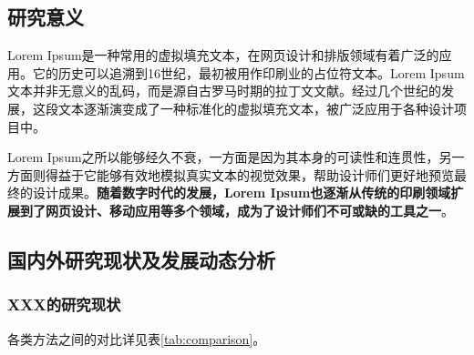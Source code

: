 \documentclass[UTF8,12pt,AutoFakeBold=2]{ctexart}
\begin{document}



\subsection{研究意义}

Lorem Ipsum是一种常用的虚拟填充文本，在网页设计和排版领域有着广泛的应用。它的历史可以追溯到16世纪，最初被用作印刷业的占位符文本。Lorem Ipsum文本并非无意义的乱码，而是源自古罗马时期的拉丁文文献。经过几个世纪的发展，这段文本逐渐演变成了一种标准化的虚拟填充文本，被广泛应用于各种设计项目中\cite{iijima1991helical}。

Lorem Ipsum之所以能够经久不衰，一方面是因为其本身的可读性和连贯性，另一方面则得益于它能够有效地模拟真实文本的视觉效果，帮助设计师们更好地预览最终的设计成果。\textbf{随着数字时代的发展，Lorem Ipsum也逐渐从传统的印刷领域扩展到了网页设计、移动应用等多个领域，成为了设计师们不可或缺的工具之一}\cite{iijima1991helical, aharony2000large, susskind1995world, kitaev2003fault}。

\subsection{国内外研究现状及发展动态分析}

\subsubsection{XXX的研究现状}

各类方法之间的对比详见表\ref{tab:comparison}。
\end{document}
